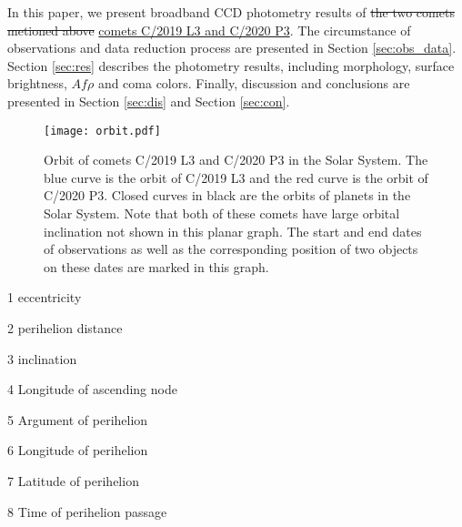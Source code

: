 In this paper, we present broadband CCD photometry results of \st{the two comets metioned above} \ul{comets C/2019 L3 and C/2020 P3}. The circumstance of observations and data reduction process are presented in Section \ref{sec:obs_data}. Section \ref{sec:res} describes the photometry results, including morphology, surface brightness, $Af\rho$ and coma colors. Finally, discussion and conclusions are presented in Section \ref{sec:dis} and Section \ref {sec:con}. 

\begin{figure}
    \centering
    \texttt{[image: orbit.pdf]}
    \caption{Orbit of comets C/2019 L3 and C/2020 P3 in the Solar System. The blue curve is the orbit of C/2019 L3 and the red curve is the orbit of C/2020 P3. Closed curves in black are the orbits of planets in the Solar System. Note that both of these comets have large orbital inclination not shown in this planar graph. The start and end dates of observations as well as the corresponding position of two objects on these dates are marked in this graph. }
    \label{fig:orbit}
\end{figure}

\begin{table}
    \centering
    \caption{Orbital elements of comets C/2019 L3 and C/2020 P3 (Epoch: ). }\label{tab:orb_elem}
    \begin{threeparttable}
        \begin{tablenotes}
            \item[1] eccentricity 
            \item[2] perihelion distance
            \item[3] inclination
            \item[4] Longitude of ascending node
            \item[5] Argument of perihelion
            \item[6] Longitude of perihelion
            \item[7] Latitude of perihelion
            \item[8] Time of perihelion passage
        \end{tablenotes}
    \end{threeparttable}
\end{table}
